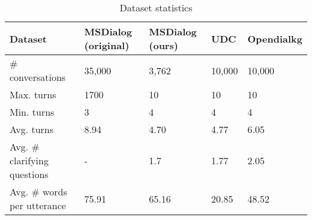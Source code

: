 \documentclass[format=acmsmall, review=False, screen=true]{acmart}
\begin{document}
\begin{table}[htbb]
\footnotesize
\caption{Dataset statistics}
\begin{center}
\begin{tabular}{|l|l|l|l|l|}
\hline
Dataset           & MSDialog (original) & MSDialog (ours) & UDC & Opendialkg \\
\hline
\# conversations & 35,000 & 3,762 & 10,000 & 10,000  \\
\hline
Max. turns        & 1700 & 10  & 10 & 10    \\
\hline
Min. turns        & 3 & 4  & 4 & 4     \\
\hline
Avg. turns        & 8.94 & 4.70  & 4.77 & 6.05 \\
\hline
Avg. \# clarifying questions & - & 1.7 & 1.77 & 2.05 \\ 
\hline
Avg. \# words per utterance  & 75.91 & 65.16 & 20.85 & 48.52  \\
\hline

\end{tabular}
\label{datasetstat}
\end{center}
\end{table}
\end{document}
